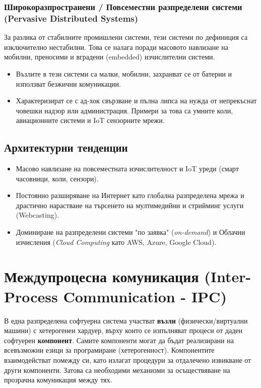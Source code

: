 \documentclass{scrartcl}
\begin{document}
\begin{FlushLeft}
\subsubsection{Широкоразпространени / Повсеместни разпределени системи (Pervasive Distributed Systems)}
За разлика от стабилните промишлени системи, тези системи по дефиниция са изключително нестабилни. Това се налага поради масовото навлизане на мобилни, преносими и вградени (embedded) изчислителни системи.
\begin{itemize}
    \item Възлите в тези системи са малки, мобилни, захранват се от батерии и използват безжични комуникации.
    \item Характеризират се с ад-хок свързване и пълна липса на нужда от непрекъснат човешки надзор или администрация. Примери за това са умните коли, авиационните системи и IoT сензорните мрежи.
\end{itemize}

\subsection{Архитектурни тенденции}
\begin{itemize}
    \item Масово навлизане на повсеместната изчислителност и IoT уреди (смарт часовници, коли, сензори).
    \item Постоянно разширяване на Интернет като глобална разпределена мрежа и драстично нарастване на търсенето на мултимедийни и стрийминг услуги (Webcasting).
    \item Доминиране на разпределени системи "по заявка" (\textit{on-demand}) и Облачни изчисления (\textit{Cloud Computing} като AWS, Azure, Google Cloud).
\end{itemize}

\section{Междупроцесна комуникация (Inter-Process Communication - IPC)}

В една разпределена софтуерна система участват \textbf{възли} (физически/виртуални машини) с хетерогенен хардуер, върху които се изпълняват процеси от даден софтуерен \textbf{компонент}. Самите компоненти могат да бъдат реализирани на всевъзможни езици за програмиране (хетерогенност). Компонентите взаимодействат помежду си, като излагат процедури за отдалечено извикване от други компоненти. Затова са необходими механизми за осъществяване на прозрачна комуникация между тях.


\end{FlushLeft}
\end{document}

